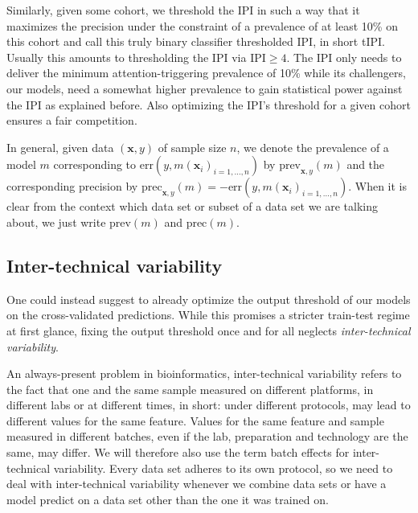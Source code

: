 Similarly, given some cohort, we threshold the IPI in such a way that it maximizes the precision under 
the constraint of a prevalence of at least \num{10}\% on this cohort and call this truly 
binary classifier thresholded IPI, in short tIPI. Usually this amounts to thresholding the IPI via 
$\text{IPI} \geq 4$. The IPI only needs to deliver the minimum 
attention-triggering prevalence of \num{10}\% while its challengers, our models, need a somewhat 
higher prevalence to gain statistical power against the IPI as explained before. Also optimizing 
the IPI's threshold for a given cohort ensures a fair competition.

In general, given data $(\mathbf{x}, y)$ of sample size $n$, we denote the prevalence of a model 
$m$ corresponding to 
$\text{err}(y, m(\mathbf{x}_i)_{i = 1, \ldots, n})$ by $\text{prev}_{\mathbf{x}, y}(m)$ and the corresponding 
precision by $\text{prec}_{\mathbf{x}, y}(m) = -\text{err}(y, m(\mathbf{x}_i)_{i = 1, \ldots, n})$. When it 
is clear from the context which data set or subset of a data set we are talking about, we just write 
$\text{prev}(m)$ and $\text{prec}(m)$.

\subsection{Inter-technical variability} 
One could instead suggest to already optimize the output threshold of our models on the cross-validated 
predictions. While this promises a stricter train-test regime at first glance, fixing the output 
threshold once and for all neglects \textit{inter-technical variability}. 

An always-present problem in bioinformatics, inter-technical variability refers to the fact that 
one and the same sample measured on different platforms, in different labs or at different times, 
in short: under different protocols, may lead to different values for the same feature. 
Values for the same feature and sample measured in different batches, even if the lab, preparation 
and technology are the same, may differ. We will therefore also use the term batch effects for 
inter-technical variability. Every data set adheres to its own protocol, so we need to deal with 
inter-technical variability whenever we combine data sets or have a model predict on a data set 
other than the one it was trained on.

